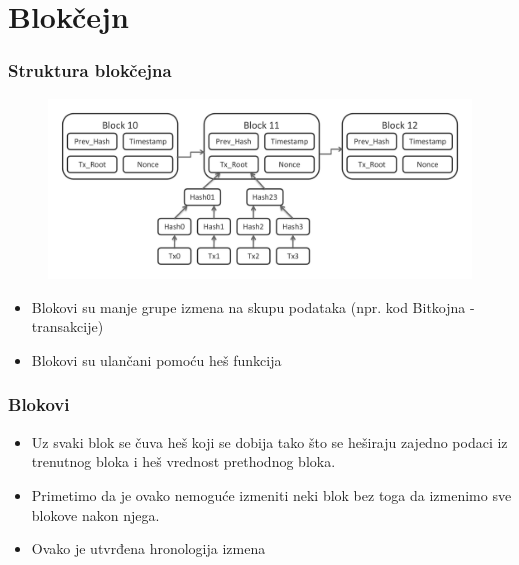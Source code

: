 \documentclass{beamer}
\begin{document}
\section{Blokčejn}

\begin{frame}[fragile]\frametitle{Struktura blokčejna}
	\begin{figure}[H]
		\includegraphics[scale=0.25]{bitcoin_blockchain_diagram.pdf}
	\end{figure}
	\begin{itemize}
		\item Blokovi su manje grupe izmena na skupu podataka (npr. kod Bitkojna - transakcije)
		\item Blokovi su ulančani pomoću heš funkcija
	\end{itemize}
\end{frame}

\begin{frame}[fragile]\frametitle{Blokovi}
	\begin{itemize}
		\item Uz svaki blok se čuva heš koji se dobija tako što se heširaju zajedno podaci iz trenutnog bloka i heš vrednost prethodnog bloka.
		\item Primetimo da je ovako nemoguće izmeniti neki blok bez toga da izmenimo sve blokove nakon njega.
		\item Ovako je utvrđena hronologija izmena
	\end{itemize}
\end{frame}
\end{document}
